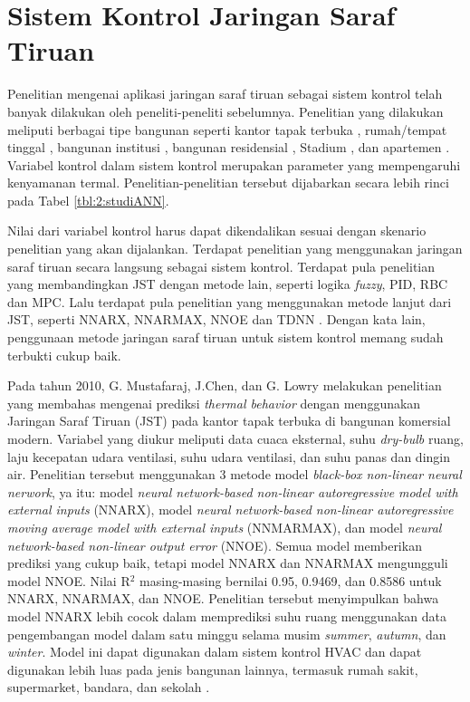\section{Sistem Kontrol Jaringan Saraf Tiruan}

Penelitian mengenai aplikasi jaringan saraf tiruan sebagai sistem kontrol telah banyak dilakukan oleh peneliti-peneliti sebelumnya. Penelitian yang dilakukan meliputi berbagai tipe bangunan seperti kantor tapak terbuka \cite{article11}, rumah/tempat tinggal \cite{article12}\cite{article13}, bangunan institusi \cite{article14}, bangunan residensial \cite{article15}, Stadium \cite{article16}, dan apartemen \cite{article17}. Variabel kontrol dalam sistem kontrol merupakan parameter yang mempengaruhi kenyamanan termal. Penelitian-penelitian tersebut dijabarkan secara lebih rinci pada Tabel \ref{tbl:2:studiANN}.

Nilai dari variabel kontrol harus dapat dikendalikan sesuai dengan skenario penelitian yang akan dijalankan. Terdapat penelitian yang menggunakan jaringan saraf tiruan secara langsung sebagai sistem kontrol. Terdapat pula penelitian yang membandingkan JST dengan metode lain, seperti logika \textit{fuzzy}, PID, RBC dan MPC. Lalu terdapat pula penelitian yang menggunakan metode lanjut dari JST, seperti NNARX, NNARMAX, NNOE \cite{article11} dan TDNN \cite{article15}. Dengan kata lain, penggunaan metode jaringan saraf tiruan untuk sistem kontrol memang sudah terbukti cukup baik.

Pada tahun 2010, G. Mustafaraj, J.Chen, dan G. Lowry melakukan penelitian yang membahas mengenai prediksi \textit{thermal behavior} dengan menggunakan Jaringan Saraf Tiruan (JST) pada kantor tapak terbuka di bangunan komersial modern. Variabel yang diukur meliputi data cuaca eksternal, suhu \textit{dry-bulb} ruang, laju kecepatan udara ventilasi, suhu udara ventilasi, dan suhu panas dan dingin air. Penelitian tersebut menggunakan 3 metode model \textit{black-box non-linear neural nerwork}, ya	itu: model \textit{neural network-based non-linear autoregressive model with external inputs} (NNARX), model \textit{ neural network-based non-linear autoregressive moving average model with external inputs} (NNMARMAX), dan model \textit{neural network-based non-linear output error} (NNOE). Semua model memberikan prediksi yang cukup baik, tetapi model NNARX dan NNARMAX mengungguli model NNOE. Nilai R$^2$ masing-masing bernilai 0.95, 0.9469, dan 0.8586 untuk NNARX, NNARMAX, dan NNOE. Penelitian tersebut menyimpulkan bahwa model NNARX lebih cocok dalam memprediksi suhu ruang menggunakan data pengembangan model dalam satu minggu selama musim \textit{summer}, \textit{autumn}, dan \textit{winter}. Model ini dapat digunakan dalam sistem kontrol HVAC dan dapat digunakan lebih luas pada jenis bangunan lainnya, termasuk rumah sakit, supermarket, bandara, dan sekolah \cite{article11}.

